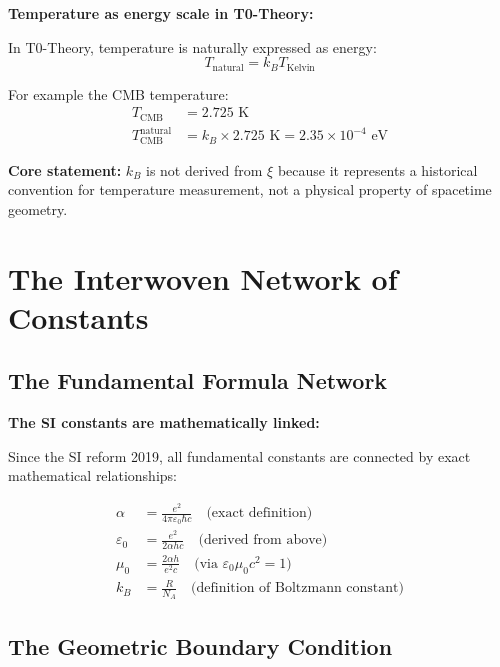 \documentclass[12pt,a4paper]{article}
\begin{document}
	\begin{insight}
		\textbf{Temperature as energy scale in T0-Theory:}
		
		In T0-Theory, temperature is naturally expressed as energy:
		\begin{equation}
			T_{\text{natural}} = k_B T_{\text{Kelvin}}
		\end{equation}
		
		For example the CMB temperature:
		\begin{align}
			T_{\text{CMB}} &= 2.725 \text{ K} \\
			T_{\text{CMB}}^{\text{natural}} &= k_B \times 2.725 \text{ K} = 2.35 \times 10^{-4} \text{ eV}
		\end{align}
		
		\textbf{Core statement:} $k_B$ is not derived from $\xi$ because it represents a historical convention for temperature measurement, not a physical property of spacetime geometry.
	\end{insight}
	
	\section{The Interwoven Network of Constants}
	
	\subsection{The Fundamental Formula Network}
	
	\begin{derivation}
		\textbf{The SI constants are mathematically linked:}
		
		Since the SI reform 2019, all fundamental constants are connected by exact mathematical relationships:
		
		\begin{align}
			\alpha &= \frac{e^2}{4\pi\varepsilon_0\hbar c} \quad \text{(exact definition)} \\
			\varepsilon_0 &= \frac{e^2}{2\alpha h c} \quad \text{(derived from above)} \\
			\mu_0 &= \frac{2\alpha h}{e^2 c} \quad \text{(via } \varepsilon_0\mu_0c^2 = 1) \\
			k_B &= \frac{R}{N_A} \quad \text{(definition of Boltzmann constant)}
		\end{align}
	\end{derivation}
	
	\subsection{The Geometric Boundary Condition}
	
\end{document}
